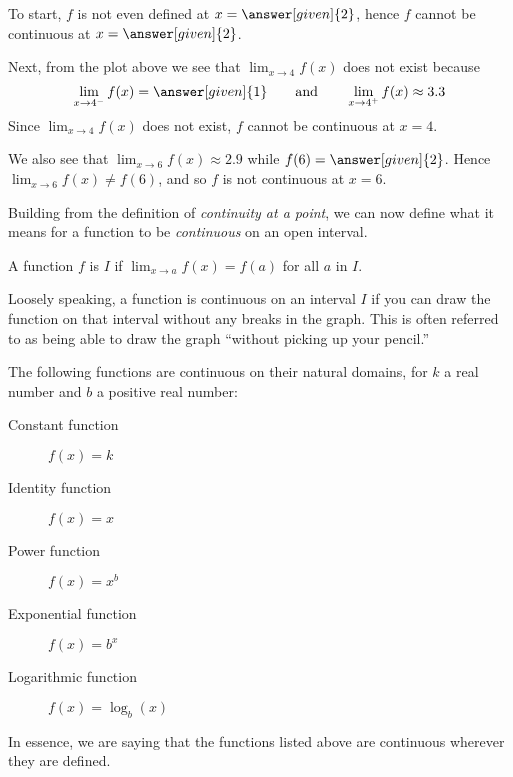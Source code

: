 \documentclass{ximera}
\begin{document}
\begin{example}
\begin{explanation}
  To start, $f$ is not even defined at $x=\answer[given]{2}$, hence $f$
  cannot be continuous at $x=\answer[given]{2}$.

  Next, from the plot above we see that $\lim_{x\to 4} f(x)$ does not
  exist because
  \[
  \lim_{x\to 4^-}f(x) = \answer[given]{1}\qquad\text{and}\qquad \lim_{x\to 4^+}f(x) \approx 3.3
  \]
  Since $\lim_{x\to 4} f(x)$ does not exist, $f$ cannot be continuous
  at $x=4$.

  We also see that $\lim_{x\to 6} f(x) \approx
 2.9$ while $f(6) =
  \answer[given]{2}$. Hence $\lim_{x\to 6} f(x) \ne f(6)$, and so $f$
  is not continuous at $x=6$.
\end{explanation}
\end{example}


Building from the definition of \textit{continuity at a point}, we can
now define what it means for a function to be \textit{continuous} on
an open interval.

\begin{definition}
  A function $f$ is  $I$ if
  $\lim_{x\to a} f(x) = f(a)$ for all $a$ in $I$.
\end{definition}

Loosely speaking, a function is continuous on an interval $I$ if you
can draw the function on that interval without any breaks in the
graph.  This is often referred to as being able to draw the graph
``without picking up your pencil.''

\begin{theorem}\label{theorem:continuity}
The following functions are continuous on their natural domains, for $k$ a real number and $b$ a positive real number:
\begin{description}
\item[Constant function] $f(x) =k$
\item[Identity function] $f(x) = x$
\item[Power function] $f(x)=x^b$
\item[Exponential function] $f(x)=b^x$
\item[Logarithmic function] $f(x)=\log_b(x)$
\end{description}
In essence, we are saying that the functions listed above are
continuous wherever they are defined.

\end{theorem}
\end{document}
